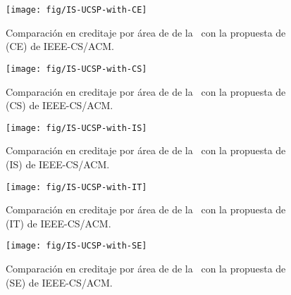 \begin{figure}[h!]
\centering
	\texttt{[image: fig/IS-UCSP-with-CE]}
	\caption{Comparación en creditaje por área de \SchoolShortName de la \siglas~con la propuesta de  (CE) de IEEE-CS/ACM.}
	\label{fig:comparing-IS-UCSP-with-CE}
\end{figure}

\begin{figure}[h!]
\centering
	\texttt{[image: fig/IS-UCSP-with-CS]}
	\caption{Comparación en creditaje por área de \SchoolShortName de la \siglas~con la propuesta de  (CS) de IEEE-CS/ACM.}
	\label{fig:comparing-IS-UCSP-with-CS}
\end{figure}

\begin{figure}[h!]
\centering
	\texttt{[image: fig/IS-UCSP-with-IS]}
	\caption{Comparación en creditaje por área de \SchoolShortName de la \siglas~con la propuesta de  (IS) de IEEE-CS/ACM.}
	\label{fig:comparing-IS-UCSP-with-IS}
\end{figure}

\begin{figure}[h!]
\centering
	\texttt{[image: fig/IS-UCSP-with-IT]}
	\caption{Comparación en creditaje por área de \SchoolShortName de la \siglas~con la propuesta de  (IT) de IEEE-CS/ACM.}
	\label{fig:comparing-IS-UCSP-with-IT}
\end{figure}

\begin{figure}[h!]
\centering
	\texttt{[image: fig/IS-UCSP-with-SE]}
	\caption{Comparación en creditaje por área de \SchoolShortName de la \siglas~con la propuesta de  (SE) de IEEE-CS/ACM.}
	\label{fig:comparing-IS-UCSP-with-SE}
\end{figure}


